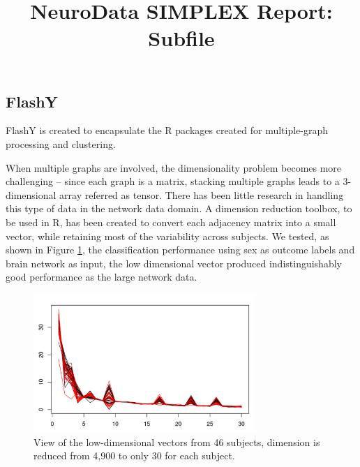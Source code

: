 \documentclass[simplex.tex]{subfiles}
\title{NeuroData SIMPLEX Report: Subfile}
\begin{document}

\subsection{FlashY}

FlashY is created to encapsulate the R packages created for
multiple-graph processing and clustering. 


When multiple graphs are involved, the dimensionality problem becomes
more challenging -- since each graph is a matrix, stacking multiple
graphs leads to a 3-dimensional array referred as tensor. There has been
little research in handling this type of data in the network data
domain. A dimension reduction toolbox, to be used in R, has been created
to convert each adjacency matrix into a small vector, while retaining
most of the variability across subjects. We tested, as shown in Figure
\ref{fig:flashy}, the classification performance using sex as outcome
labels and brain network as input, the low dimensional vector produced
indistinguishably good performance as the large network data.


\begin{figure}[h!]
\begin{cframed}
\centering
\includegraphics[width=0.75\textwidth]{../../figs/flashY.png}
\caption{
View of the low-dimensional vectors from 46 subjects, dimension is
reduced from 4,900 to only 30 for each subject.
}
\label{fig:flashy}
\end{cframed}
\end{figure}
\end{document}
